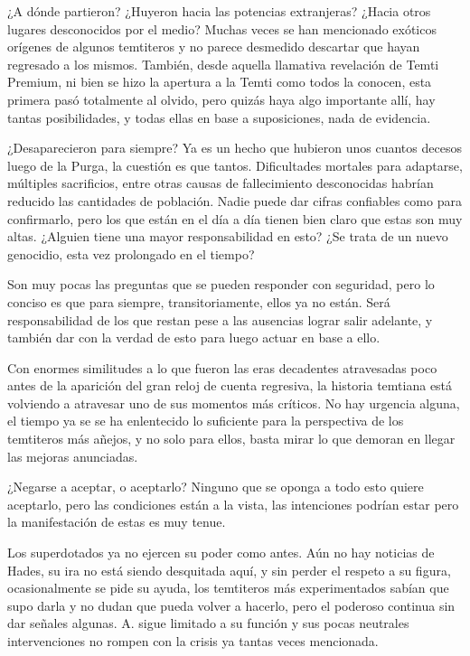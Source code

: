 \documentclass[
  spanish,
]{book}
\begin{document}
¿A dónde partieron? ¿Huyeron hacia las potencias extranjeras? ¿Hacia otros lugares desconocidos por el medio?
Muchas veces se han mencionado exóticos orígenes de algunos temtiteros y no parece desmedido descartar que hayan regresado a los mismos. También, desde aquella llamativa revelación de Temti Premium, ni bien se hizo la apertura a la Temti como todos la conocen, esta primera pasó totalmente al olvido, pero quizás haya algo importante allí, hay tantas posibilidades, y todas ellas en base a suposiciones, nada de evidencia.

¿Desaparecieron para siempre?
Ya es un hecho que hubieron unos cuantos decesos luego de la Purga, la cuestión es que tantos.
Dificultades mortales para adaptarse, múltiples sacrificios, entre otras causas de fallecimiento desconocidas habrían reducido las cantidades de población. Nadie puede dar cifras confiables como para confirmarlo, pero los que están en el día a día tienen bien claro que estas son muy altas. ¿Alguien tiene una mayor responsabilidad en esto? ¿Se trata de un nuevo genocidio, esta vez prolongado en el tiempo?

Son muy pocas las preguntas que se pueden responder con seguridad, pero lo conciso es que para siempre, transitoriamente, ellos ya no están. Será responsabilidad de los que restan pese a las ausencias lograr salir adelante, y también dar con la verdad de esto para luego actuar en base a ello.

Con enormes similitudes a lo que fueron las eras decadentes atravesadas poco antes de la aparición del gran reloj de cuenta regresiva, la historia temtiana está volviendo a atravesar uno de sus momentos más críticos. No hay urgencia alguna, el tiempo ya se se ha enlentecido lo suficiente para la perspectiva de los temtiteros más añejos, y no solo para ellos, basta mirar lo que demoran en llegar las mejoras anunciadas.

¿Negarse a aceptar, o aceptarlo? Ninguno que se oponga a todo esto quiere aceptarlo, pero las condiciones están a la vista, las intenciones podrían estar pero la manifestación de estas es muy tenue.

Los superdotados ya no ejercen su poder como antes. Aún no hay noticias de Hades, su ira no está siendo desquitada aquí, y sin perder el respeto a su figura, ocasionalmente se pide su ayuda, los temtiteros más experimentados sabían que supo darla y no dudan que pueda volver a hacerlo, pero el poderoso continua sin dar señales algunas. A. sigue limitado a su función y sus pocas neutrales intervenciones no rompen con la crisis ya tantas veces mencionada.
\end{document}
